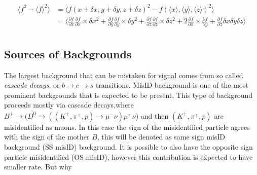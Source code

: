 \begin{equation}
\begin{aligned}
	\langle f^{2}-\langle f \rangle^{2} \rangle  &=  \langle f(x+\delta x, y+\delta y, z+\delta z)^{2} - f(\langle x \rangle, \langle y \rangle, \langle z \rangle)^{2} \rangle \\
	&= \langle \frac{\partial{f}}{\partial{x}}  \frac{\partial{f}}{\partial{x}} \times \delta x^{2} + \frac{\partial{f}}{\partial{y}}  \frac{\partial{f}}{\partial{y}} \times \delta y^{2} + \frac{\partial{f}}{\partial{z}}  \frac{\partial{f}}{\partial{z}} \times \delta z^{2} + 2 \frac{\partial{f}}{\partial{x}} \times \frac{\partial{f}}{\partial{y}} + \frac{\partial{f}}{\partial{z}} \delta x \delta y \delta z  \rangle \\ 
\end{aligned}
\end{equation}



\subsection{Sources of Backgrounds}
The largest background that can be mistaken for signal comes from so called \textit{cascade decays}, or $b \rightarrow c \rightarrow s$ transitions. MisID background is one of the most prominent backgrounds that is expected to be present. This type of background proceeds mostly via cascade decays,where $B^{+} \rightarrow (\overline{D^{0}} \rightarrow ((K^{+},\pi^{+},p) \rightarrow \mu^{-} \nu) \mu^{+} \nu$) and then $(K^{+},\pi^{+},p)$ are misidentified as muons. In this case the sign of the misidentified particle agrees with the sign of the mother $B$, this will be denoted as same sign misID background (SS misID) background. It is possible to also have the opposite sign particle misidentified (OS misID), however this contribution is expected to have smaller rate. But why 

